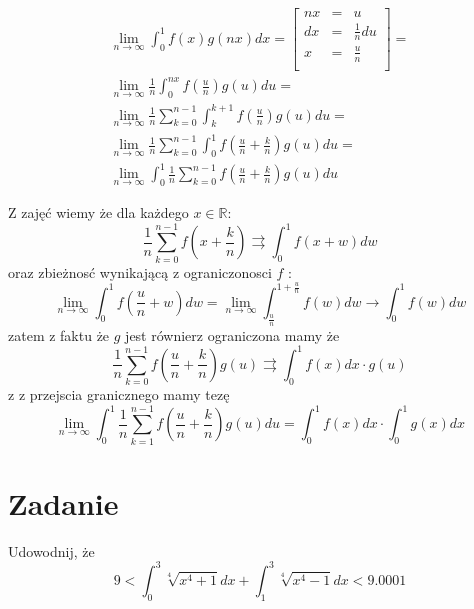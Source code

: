 \documentclass[11pt]{scrartcl}
\begin{document}
          \begin{gather*}
            \lim_{n \to \infty } \int_0^1 f(x) g(nx) dx = 
            \left [ \begin{array}{rcl}
                      nx &=& u \\
                      dx &=& \frac{1}{n} du \\
                      x &=& \frac{u}{n} \\
            \end{array} \right ] = \\
            \lim_{n \to \infty }  \frac{1}{n} \int_0^{nx} f( \frac{u}{n} ) g(u) du = \\
            \lim_{n \to \infty }  \frac{1}{n} \sum_{k=0}^{n-1} \int_k^{k+1} f(\frac{u}{n}) g(u) du = \\
            \lim_{n \to \infty }  \frac{1}{n} \sum_{k=0}^{n-1} \int_0^1 f(\frac{u}{n} + \frac{k}{n}) g(u) du = \\
            \lim_{n \to \infty } \int_0^1 \frac{1}{n} \sum_{k=0}^{n-1} f( \frac{u}{n} + \frac{k}{n} ) g(u) du 
          \end{gather*}

          Z zajęć wiemy że dla każdego $x \in \mathbb{R} $:
          \[
              \frac{1}{n} \sum_{k=0}^{n-1} f( x + \frac{k}{n} ) \rightrightarrows \int_0^1 f(x + w) dw
          \]
          oraz zbieżnosć wynikającą z ograniczonosci $f$ :
          \[
            \lim_{n \to \infty }  \int_0^1 f(\frac{u}{n} + w) dw = \lim_{n \to \infty } \int_{\frac{u}{n}}^{1+\frac{u}{n}} f(w) dw \to \int_0^1 f(w) dw 
          \]
          zatem z faktu że $g$ jest równierz ograniczona mamy że
          \[
              \frac{1}{n} \sum_{k=0}^{n-1} f( \frac{u}{n} + \frac{k}{n} ) g(u) \rightrightarrows \int_0^1 f(x) dx \cdot g(u)  
          \]
          z z przejscia granicznego mamy tezę
          \[
              \lim_{n \to \infty } \int_0^1 \frac{1}{n} \sum_{k=1}^{n-1} f( \frac{u}{n} + \frac{k}{n} ) g(u) du = \int_0^1 f(x) dx \cdot \int_0^1 g(x) dx   
          \]

      \section{Zadanie}
      
          \begin{zadanie}
              Udowodnij, że
              \[
                  9 < \int_0^3 \sqrt[4]{x^4 + 1} dx + \int_1^3 \sqrt[4]{x^4 - 1} dx < 9.0001  
              \]
              
          \end{zadanie}
          
\end{document}
